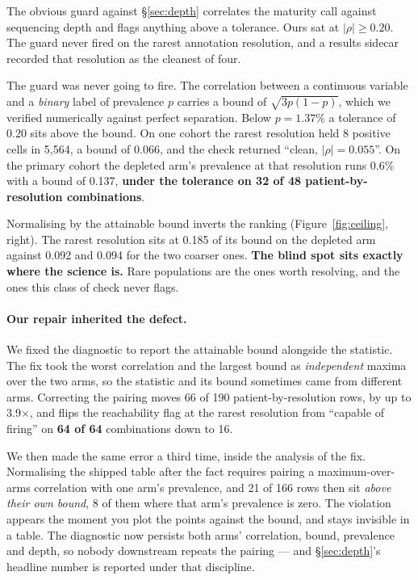 \documentclass{article}
\begin{document}
The obvious guard against \S\ref{sec:depth} correlates the maturity call against
sequencing depth and flags anything above a tolerance. Ours sat at
$|\rho| \geq 0.20$. The guard never fired on the rarest annotation resolution,
and a results sidecar recorded that resolution as the cleanest of four.

The guard was never going to fire. The correlation between a continuous variable
and a \emph{binary} label of prevalence $p$ carries a bound of
$\sqrt{3p(1-p)}$, which we verified numerically against perfect separation. Below
$p = 1.37\%$ a tolerance of 0.20 sits above the bound. On one cohort the rarest
resolution held 8 positive cells in 5{,}564, a bound of 0.066, and the check
returned ``clean, $|\rho| = 0.055$''. On the primary cohort the depleted arm's
prevalence at that resolution runs 0.6\% with a bound of 0.137, \textbf{under the
tolerance on 32 of 48 patient-by-resolution combinations}.

Normalising by the attainable bound inverts the ranking
(Figure~\ref{fig:ceiling}, right). The rarest resolution sits at 0.185 of its
bound on the depleted arm against 0.092 and 0.094 for the two coarser ones.
\textbf{The blind spot sits exactly where the science is.} Rare populations are
the ones worth resolving, and the ones this class of check never flags.

\paragraph{Our repair inherited the defect.} We fixed the diagnostic to report
the attainable bound alongside the statistic. The fix took the worst correlation
and the largest bound as \emph{independent} maxima over the two arms, so the
statistic and its bound sometimes came from different arms. Correcting the
pairing moves 66 of 190 patient-by-resolution rows, by up to 3.9$\times$, and
flips the reachability flag at the rarest resolution from ``capable of firing''
on \textbf{64 of 64} combinations down to 16.

We then made the same error a third time, inside the analysis of the fix.
Normalising the shipped table after the fact requires pairing a
maximum-over-arms correlation with one arm's prevalence, and 21 of 166 rows then
sit \emph{above their own bound}, 8 of them where that arm's prevalence is zero.
The violation appears the moment you plot the points against the bound, and stays
invisible in a table. The diagnostic now persists both arms' correlation, bound,
prevalence and depth, so nobody downstream repeats the pairing --- and
\S\ref{sec:depth}'s headline number is reported under that discipline.
\end{document}
